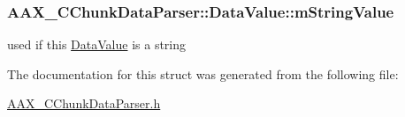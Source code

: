 \hypertarget{a00144_a339c73c9bc16e4c4765911f4f0072814}{}
\subsubsection[{m\+String\+Value}]{ A\+A\+X\+\_\+\+C\+Chunk\+Data\+Parser\+::\+Data\+Value\+::m\+String\+Value}\label{a00144_a339c73c9bc16e4c4765911f4f0072814}


used if this \hyperlink{a00144}{Data\+Value} is a string 



The documentation for this struct was generated from the following file\+:\begin{DoxyCompactItemize}
\item 
\hyperlink{a00168}{A\+A\+X\+\_\+\+C\+Chunk\+Data\+Parser.\+h}\end{DoxyCompactItemize}
